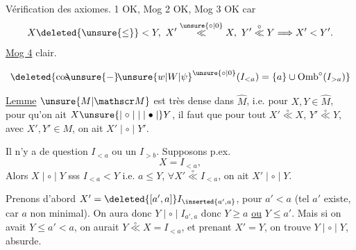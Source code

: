 Vérification des axiomes.  1 OK, Mog 2 OK, Mog 3 OK car
\[
X\deleted{\unsure{\leq}}<Y,\ X'\overset{\unsure{\circ|0}}{\ll}X,\ Y'\overset{\circ}{\ll}Y\Longrightarrow X'<Y'.
\]
\uline{Mog 4} clair.

\[
\deleted{\mathrm{cos}\!\!\unsure{-}\!{\unsure{w|W|\psi}}^{\unsure{\circ|0}}(I_{<a})=\{a\}\cup\operatorname{Omb}^{\circ}(I_{>a})}
\]

\uline{Lemme} $\unsure{M|\mathscr M}$ est très dense dans $\widehat M$, i.e. pour $X,Y\in\widehat M$, pour qu'on ait $X\unsure{\mid\circ\mid|\mid\bullet\mid}Y$, il faut que pour tout $X'\overset{\circ}{\ll}X$, $Y'\overset{\circ}{\ll}Y$, avec $X',Y'\in M$, on ait $X'\mid\circ\mid Y'$.

 Il n'y a de question   $I_{<a}$ ou un $I_{>b}$. Supposons p.ex.
\[
X=I_{<a},
\]
 Alors  $X\mid\circ\mid Y$ sss $I_{<a}<Y$ i.e. $a\leq Y$,  $\forall X'\overset{\circ}{\ll}I_{<a}$, on ait $X'\mid\circ\mid Y$.


Prenons d'abord $X'=\deleted{[a',a]}I_{\inserted{a',a}}$, pour $a'<a$ (tel $a'$ existe, car $a$ non minimal). On aura donc $Y\mid\circ\mid I_{a',a}$ donc $Y\geq a$ \uline{ou} $Y\leq a'$. Mais si on avait $Y\leq a'<a$, on aurait $Y\overset{\circ}{\ll}X=I_{<a}$, et prenant $X'=Y$, on trouve $Y\mid\circ\mid Y$, absurde.

